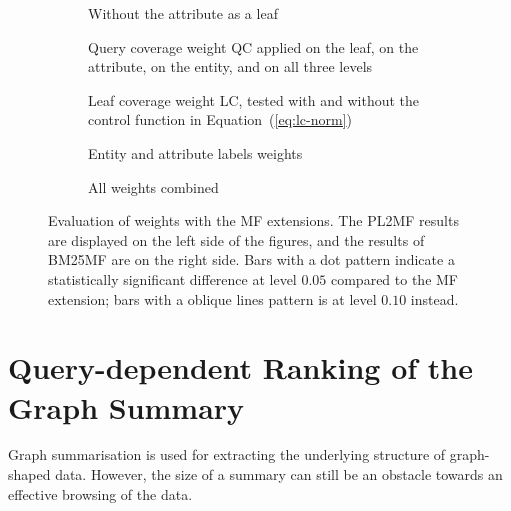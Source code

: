 \begin{figure}
	\centering
	\begin{subfigure}{.483\textwidth}
		\centering
		\resizebox{\textwidth}{!}{
			
		}
		\caption{Without the attribute as a leaf}
		\label{fig:mf-att}
	\end{subfigure}
	\quad
	\begin{subfigure}{.483\textwidth}
		\centering
		\resizebox{\textwidth}{!}{
			
		}
		\caption{Query coverage weight QC applied on the leaf, on the attribute, on the entity, and on all three levels}
		\label{fig:mf-qc}
	\end{subfigure}
	\qquad
	\begin{subfigure}{.483\textwidth}
		\centering
		\resizebox{\textwidth}{!}{
			
		}
		\caption{Leaf coverage weight LC, tested with and without the control function in Equation~(\ref{eq:lc-norm})}
		\label{fig:mf-lc}
	\end{subfigure}
	\quad
	\begin{subfigure}{.483\textwidth}
		\centering
		\resizebox{\textwidth}{!}{
			
		}
		\caption{Entity and attribute labels weights}
		\label{fig:mf-ael}
	\end{subfigure}
	\qquad
	\begin{subfigure}{.8\textwidth}
		\centering
		\resizebox{\textwidth}{!}{
			
		}
		\caption{All weights combined}
		\label{fig:mf-all}
	\end{subfigure}
	\caption[Evaluation of weights with the MF ranking extensions]{Evaluation of weights with the \gls{MF} extensions. The \gls{PL2MF} results are displayed on the left side of the figures, and the results of \gls{BM25MF} are on the right side. Bars with a dot pattern indicate a statistically significant difference at level $0.05$ compared to the \gls{MF} extension; bars with a oblique lines pattern is at level $0.10$ instead.}
	\label{fig:mf-weights}
\end{figure}

\section{Query-dependent Ranking of the Graph Summary}
\label{sec:summary-ranking}

Graph summarisation is used for extracting the underlying structure of graph-shaped data. However, the size of a summary can still be an obstacle towards an effective browsing of the data.

